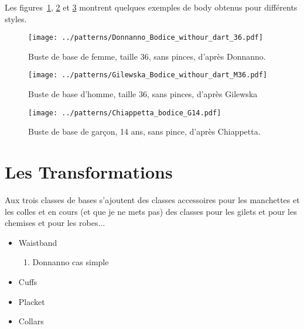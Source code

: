 \documentclass[10pt,a4paper,twoside]{report}
\begin{document}
Les figures~\ref{fig:bodice_DW36}, \ref{fig:bodice_MG36} et \ref{fig:CB14} montrent quelques exemples de body obtenus pour différents styles.


\begin{figure}[hbtp]
\centering
\texttt{[image: ../patterns/Donnanno\_Bodice\_withour\_dart\_36.pdf]}
\caption{Buste de base de femme, taille 36, sans pinces, d'après Donnanno.}
\label{fig:bodice_DW36}
\end{figure}

\begin{figure}[hbtp]
\centering
\texttt{[image: ../patterns/Gilewska\_Bodice\_withour\_dart\_M36.pdf]}
\caption{Buste de base d'homme, taille 36, sans pinces, d'après Gilewska}
\label{fig:bodice_MG36}
\end{figure}

\begin{figure}[hbtp]
\centering
\texttt{[image: ../patterns/Chiappetta\_bodice\_G14.pdf]}
\caption{Buste de base de garçon, 14 ans, sans pince, d'après Chiappetta.}
\label{fig:CB14}
\end{figure}



\section{Les Transformations}


Aux trois classes de bases s'ajoutent des classes accessoires pour les manchettes et les colles
et en cours (et que je ne mets pas) des classes pour les gilets et pour les chemises et pour les robes...

\begin{itemize}
  \item Waistband
  \begin{enumerate}
  \item Donnanno cas simple
  \end{enumerate}
  \item Cuffs
  \item Placket
  \item Collars
\end{itemize}
\end{document}
